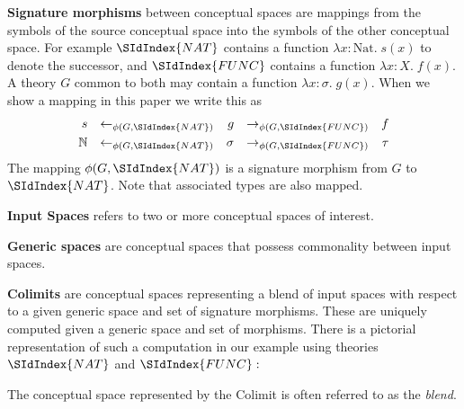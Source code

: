 {\bf Signature morphisms} between conceptual spaces are mappings from
the symbols of the source conceptual space into the symbols of the other
conceptual space. For example $\SIdIndex{NAT}$ contains a function $\lambda
x:\textrm{Nat}.\;s(x)$ to denote the successor, and $\SIdIndex{FUNC}$ contains a function
$\lambda x:X.\;f(x)$. 
A theory $G$ common to both may contain a function
$\lambda x:\sigma.\;g(x)$. When we show a mapping in this paper we write this
as
\begin{align}
s&&\leftarrow_{\phi(G,\SIdIndex{NAT})}&&g&&\rightarrow_{\phi(G,\SIdIndex{FUNC})}&&f\\
\mathbb{N}&&\leftarrow_{\phi(G,\SIdIndex{NAT})}&&\sigma&&\rightarrow_{\phi(G,\SIdIndex{FUNC})}&&\tau
\end{align}
\noindent The mapping $\phi(G,\SIdIndex{NAT})$ is a signature morphism from
$G$ to $\SIdIndex{NAT}$. Note that associated types are also mapped.

{\bf Input Spaces} refers to two or more conceptual spaces of
interest. 

{\bf Generic spaces} are conceptual spaces that possess commonality
between input spaces. 

{\bf Colimits} are conceptual spaces representing a blend of input
spaces with respect to a given generic space and set of signature
morphisms. These are uniquely computed given a generic space and set of
morphisms. There is a pictorial representation of such a computation
in our example using theories $\SIdIndex{NAT}$ and $\SIdIndex{FUNC}:$
\begin{center}
\end{center}
The conceptual space represented by the Colimit is often referred to
as the {\em blend}. 

